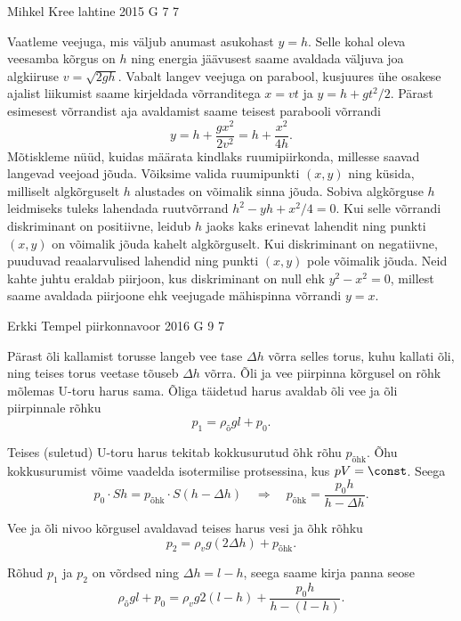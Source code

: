 \documentclass[11pt, twoside]{article}
\begin{document}
{%
{Mihkel Kree} %
{lahtine} %
{2015} %
{G 7} %
{7} %
{

\ifSolution
Vaatleme veejuga, mis väljub anumast asukohast $y=h$. Selle kohal oleva veesamba kõrgus on $h$ ning energia jäävusest saame avaldada väljuva joa algkiiruse $v=\sqrt{2gh}$. Vabalt langev veejuga on parabool, kusjuures ühe osakese ajalist liikumist saame kirjeldada võrranditega $x=vt$ ja $y=h+gt^2/2$. Pärast esimesest võrrandist aja avaldamist saame teisest parabooli võrrandi
\[
y = h + \frac{gx^2}{2v^2} = h + \frac{x^2}{4h}.
\]
Mõtiskleme nüüd, kuidas määrata kindlaks ruumipiirkonda, millesse saavad langevad veejoad jõuda. Võiksime valida ruumipunkti $(x,y)$ ning küsida, milliselt algkõrguselt $h$ alustades on võimalik sinna jõuda. Sobiva algkõrguse $h$ leidmiseks tuleks lahendada ruutvõrrand $h^2 - yh + x^2/4 = 0$. Kui selle võrrandi diskriminant on positiivne, leidub $h$ jaoks kaks erinevat lahendit ning punkti $(x,y)$ on võimalik jõuda kahelt algkõrguselt. Kui diskriminant on negatiivne, puuduvad reaalarvulised lahendid ning punkti $(x,y)$ pole võimalik jõuda. Neid kahte juhtu eraldab piirjoon, kus diskriminant on null ehk $y^2 - x^2=0$, millest saame avaldada piirjoone ehk veejugade mähispinna võrrandi $y=x$.
\fi
}

{Erkki Tempel} %
{piirkonnavoor} %
{2016} %
{G 9} %
{7} %
{

\ifSolution
Pärast õli kallamist torusse langeb vee tase $\Delta h$ võrra selles torus, kuhu kallati õli, ning teises torus veetase tõuseb $\Delta h$ võrra. Õli ja vee piirpinna kõrgusel on rõhk mõlemas U-toru harus sama. Õliga täidetud harus avaldab õli vee ja õli piirpinnale rõhku
\[ p_1 = \rho_{\text{õ}}gl + p_0.\]

Teises (suletud) U-toru harus tekitab kokkusurutud õhk rõhu $p_{\text{õhk}}$. Õhu kokkusurumist võime vaadelda isotermilise protsessina, kus $pV = \const$. Seega
\[ p_0\cdot Sh = p_{\text{õhk}}\cdot S(h-\Delta h) \quad\Rightarrow\quad p_{\text{õhk}} = \frac{p_0h}{h-\Delta h}.\]

Vee ja õli nivoo kõrgusel avaldavad teises harus vesi ja õhk rõhku
\[ p_2 = \rho_vg(2\Delta h) + p_{\text{õhk}}.\]

Rõhud $p_1$ ja $p_2$ on võrdsed ning $\Delta h = l - h$, seega saame kirja panna seose
\[ \rho_{\text{õ}}gl + p_0 = \rho_vg2(l-h) + \frac{p_0h}{h-(l-h)}.\]

}}
\end{document}
